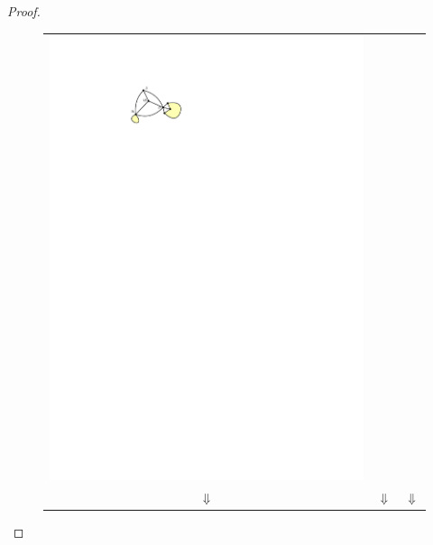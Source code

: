 \documentclass{article}
\theoremstyle{definition}
\begin{document}
\begin{proof}
\begin{figure}
\begin{tabular}{ccc}
      \includegraphics[page=8]{figs/degree_zero_killer} \\
      $\Downarrow$ & $\Downarrow$ & $\Downarrow$  \\

\end{tabular}
\end{figure}
\end{proof}
\end{document}

